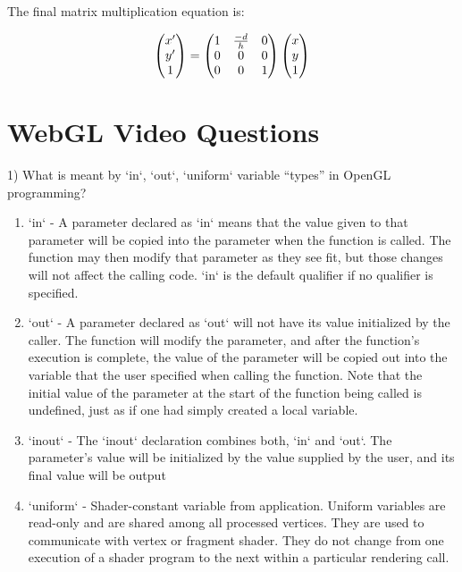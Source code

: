 \documentclass[12pt]{article}
\begin{document}
The final matrix multiplication equation is:

\begin{align}
\begin{pmatrix}
x' \\
y' \\
1  
\end{pmatrix} \nonumber
&=
\begin{pmatrix}
1 & {\frac{-d}{h}} & 0 \\
0 & 0 & 0 \hfill \\
0 & 0 & 1 \hfill 
\end{pmatrix} \nonumber
\begin{pmatrix}
x \\
y \\
1  
\end{pmatrix} \nonumber \\
\end{align}


\section{WebGL Video Questions}

1) What is meant by `in`, `out`, `uniform` variable “types” in OpenGL programming?

\begin{enumerate}

    \item `in` - A parameter declared as `in` means that the value given to that parameter will be copied into the parameter when the function is called. The function may then modify that parameter as they see fit, but those changes will not affect the calling code. `in` is the default qualifier if no qualifier is specified.

    \item `out` - A parameter declared as `out` will not have its value initialized by the caller. The function will modify the parameter, and after the function's execution is complete, the value of the parameter will be copied out into the variable that the user specified when calling the function. Note that the initial value of the parameter at the start of the function being called is undefined, just as if one had simply created a local variable.

    \item `inout` - The `inout` declaration combines both, `in` and `out`. The parameter's value will be initialized by the value supplied by the user, and its final value will be output

    \item `uniform` - Shader-constant variable from application. Uniform variables are read-only and are shared among all processed vertices. They are used to communicate with vertex or fragment shader. They do not change from one execution of a shader program to the next within a particular rendering call.

\end{enumerate}
\end{document}
